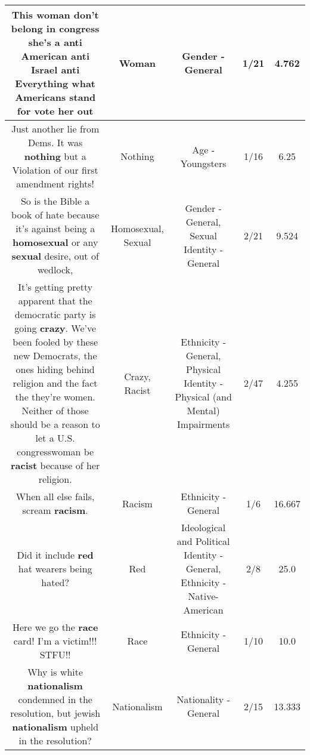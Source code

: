 \documentclass[11pt]{article}
\newlength\mylength
\begin{document}
\begin{center}
\begin{longtable}{|C{.65\mylength}|C{.30\mylength}|C{.12\mylength}|C{.12\mylength}|C{.12\mylength}|}
  \small This \textbf{woman} don't belong in congress she's a anti American anti Israel anti Everything what Americans stand for  vote her out\normalsize   & Woman & Gender - General & 1/21 & 4.762 \\  \hline
  \small Just another lie from Dems. It was \textbf{nothing} but a Violation of our first amendment rights!\normalsize   & Nothing & Age - Youngsters & 1/16 & 6.25 \\  \hline
  \small So is the Bible a book of hate because it's against being a \textbf{homosexual} or any \textbf{sexual} desire, out of wedlock,\normalsize   & Homosexual, Sexual & Gender - General, Sexual Identity - General & 2/21 & 9.524 \\  \hline
  \small It's getting pretty apparent that the democratic party is going \textbf{crazy}. We've been fooled by these new Democrats, the ones hiding behind religion and the fact the they're women. Neither of those should be a reason to let a U.S. congresswoman be \textbf{racist} because of her religion.\normalsize   & Crazy, Racist & Ethnicity - General, Physical Identity - Physical (and Mental) Impairments & 2/47 & 4.255 \\  \hline
  \small When all else fails, scream \textbf{racism}.\normalsize   & Racism & Ethnicity - General & 1/6 & 16.667 \\  \hline
  \small Did it include \textbf{r\textbf{ed}} hat wearers being hated?\normalsize   & Red &  Ideological and Political Identity - General, Ethnicity - Native-American & 2/8 & 25.0 \\  \hline
  \small Here we go the \textbf{race} card! I'm a victim!!! STFU!!\normalsize   & Race & Ethnicity - General & 1/10 & 10.0 \\  \hline
  \small Why is white \textbf{nationalism} condemned in the resolution, but jewish \textbf{nationalism} upheld in the resolution?\normalsize   & Nationalism & Nationality - General & 2/15 & 13.333 \\  \hline

\end{longtable}
\end{center}
\end{document}
